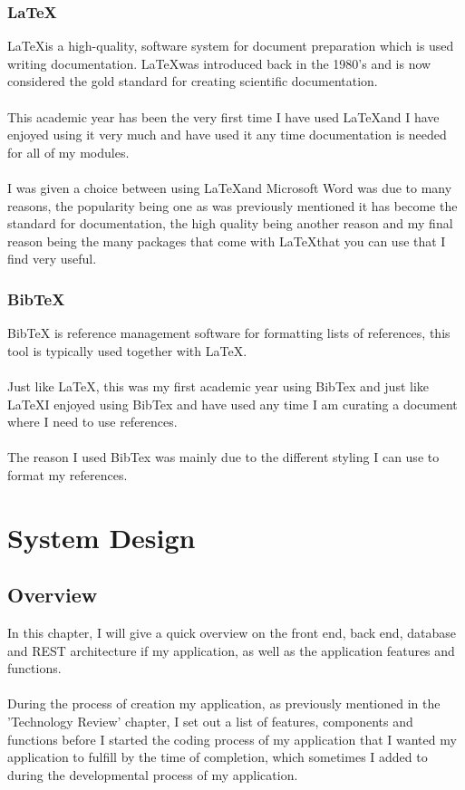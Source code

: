 \subsection{\LaTeX}

\LaTeX is a high-quality, software system for document preparation which is used writing documentation. \LaTeX was introduced back in the 1980's and is now considered the gold standard for creating scientific documentation. \\ \\
This academic year has been the very first time I have used \LaTeX and I have enjoyed using it very much and have used it any time documentation is needed for all of my modules.\\ \\
I was given a choice between using \LaTeX and Microsoft Word was due to many reasons, the popularity being one as was previously mentioned it has become the standard for documentation, the high quality being another reason and my final reason being the many packages that come with \LaTeX that you can use that I find very useful.

\subsection{BibTeX}

BibTeX is reference management software for formatting lists of references, this tool is typically used together with \LaTeX.\\ \\
Just like \LaTeX, this was my first academic year using BibTex and just like \LaTeX I enjoyed using BibTex and have used any time I am curating a document where I need to use references.\\ \\
The reason I used BibTex was mainly due to the different styling I can use to format my references.

\chapter{System Design}

\section{Overview}

In this chapter, I will give a quick overview on the front end, back end, database and REST architecture if my application, as well as the application features and functions.\\ \\
During the process of creation my application, as previously mentioned in the 'Technology Review' chapter, I set out a list of features, components and functions before I started the coding process of my application that I wanted my application to fulfill by the time of completion, which sometimes I added to during the developmental process of my application.


